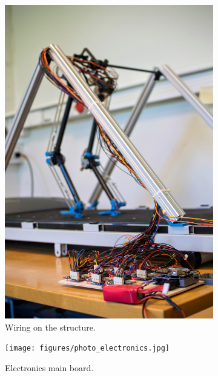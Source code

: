 \begin{figure}[ht]
\centering
  \begin{subfigure}[b]{0.4\textwidth}
    \includegraphics[width=\textwidth]{figures/photo_electronics_2.jpg}
    \caption{Wiring on the structure.}
    \label{fig:electronics1}
  \end{subfigure}
  \begin{subfigure}[b]{0.4\textwidth}
    \texttt{[image: figures/photo\_electronics.jpg]}
    \caption{Electronics main board.}
    \label{fig:electronics2}
  \end{subfigure}
  \begin{subfigure}[b]{0.4\textwidth}

\end{subfigure}
\end{figure}
